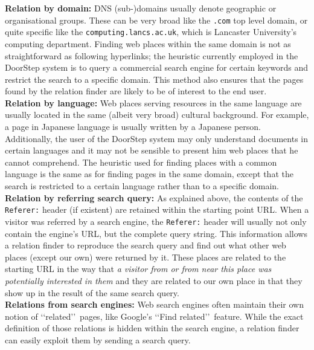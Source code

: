 \documentclass[a4paper,twoside]{danarticle}
\theoremstyle{remark}
\begin{document}
    \textbf{Relation by domain:} DNS (sub-)domains usually denote geographic or 
    organisational groups. These can be very broad like the \verb$.com$ top 
    level domain, or quite specific like the \verb$computing.lancs.ac.uk$, 
    which is Lancaster University's computing department. 
    Finding web places within the same domain is not as 
    straightforward as following hyperlinks; the heuristic currently employed 
    in the DoorStep system is to query a commercial search engine for certain 
    keywords and restrict the search to a specific domain. This method also 
    ensures that the pages found by the relation finder are likely to be 
    of interest to the end user.
    \\
    
    \textbf{Relation by language:} Web places serving resources in the same 
    language are usually located in the same (albeit very broad) cultural background. 
    For example, a page in Japanese language is usually written by a Japanese 
    person. Additionally, the user of the DoorStep system may only understand 
    documents in certain languages and it may not be sensible to present him web 
    places that he cannot comprehend. The heuristic used for finding places with 
    a common language is the same as for finding pages in the same domain,
    except that the search is restricted to a certain language rather than to a
    specific domain.
    \\
    
    \textbf{Relation by referring search query:} As explained above, the 
    contents of the \verb$Referer:$ header (if existent) are retained within the 
    starting point URL. When a visitor was referred by a search 
    engine, the \verb$Referer:$ header will usually not only contain the 
    engine's URL, but the complete query string. This information allows a 
    relation finder to reproduce the search query and find out what other web 
    places (except our own) were returned by it. These places are related to the 
    starting URL in the way that \textit{a visitor from or from near this place was 
    potentially interested in them} and they are related to our own place in
    that they show up in the result of the same search query.
    \\
    
    \textbf{Relations from search engines:} Web search engines often maintain 
    their own notion of \lq\lq related\rq\rq\ pages, like Google's 
    \lq\lq Find related\rq\rq\ feature. While the exact definition of those 
    relations is hidden within the search engine, a relation finder can 
    easily exploit them by sending a search query.
    \\
    
\end{document}

